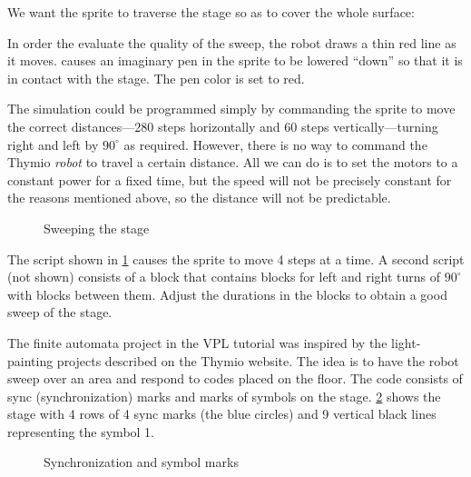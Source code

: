 

We want the  sprite to traverse the stage so as to cover the
whole surface:


In order the evaluate the quality of the sweep, the robot draws a thin
red line as it moves.  causes an imaginary pen in the
sprite to be lowered ``down'' so that it is in contact with the stage.
The pen color is set to red.

The simulation could be programmed simply by commanding the
sprite to move the correct distances---$280$ steps horizontally and
$60$ steps vertically---turning right and left by $90^{\circ}$ as
required. However, there is no way to command the Thymio \emph{robot} to
travel a certain distance. All we can do is to set the motors to a
constant power for a fixed time, but the speed will not be precisely
constant for the reasons mentioned above, so the distance will not be
predictable.

\begin{figure}
\caption{Sweeping the stage}\label{fig.sweep}
\end{figure}

The script shown in \cref{fig.sweep} causes the sprite to move 4 steps
at a time. A second script (not shown) consists of a
 block that contains blocks for left and right
turns of $90^{\circ}$ with  blocks between them. Adjust
the durations in the  blocks to obtain a good sweep of the
stage.



The finite automata project in the VPL tutorial was inspired by the
light-painting projects described on the Thymio website. The idea is to
have the robot sweep over an area and respond to codes placed on the
floor. The code consists of sync (synchronization) marks and marks of symbols
on the stage. \cref{fig.fa} shows the stage with 4 rows of 4 sync marks
(the blue circles) and 9 vertical black lines representing the symbol 1.

\begin{figure}[htb]
\caption{Synchronization and symbol marks}\label{fig.fa}
\end{figure}

\newpage

